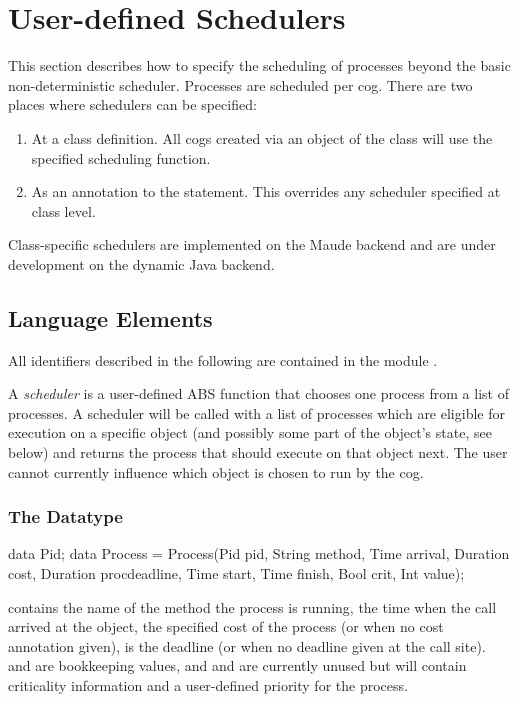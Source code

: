  \chapter{User-defined Schedulers}\label{ch:schedulers}
  This section describes how to specify the scheduling of processes
  beyond the basic non-deterministic scheduler.  Processes are scheduled
  per cog.  There are two places where schedulers can be specified:
\begin{enumerate}
\item At a class definition.  All cogs created via an object of the
  class will use the specified scheduling function.
\item As an annotation to the  statement.  This overrides
  any scheduler specified at class level.
\end{enumerate}
  Class-specific schedulers are implemented on the Maude backend and are
  under development on the dynamic Java backend.

\section{Language Elements}

  All identifiers described in the following are contained in the module
  .

  A \emph{scheduler} is a user-defined ABS function that chooses one process
  from a list of processes.  A scheduler will be called with a list of
  processes which are eligible for execution on a specific object (and
  possibly some part of the object's state, see below) and returns the
  process that should execute on that object next.  The user cannot
  currently influence which object is chosen to run by the cog.

\subsection{The  Datatype}

\begin{absexample} 
data Pid;
data Process = Process(Pid pid, String method, Time arrival,
    Duration cost, Duration procdeadline, Time start, Time finish, 
    Bool crit, Int value);
\end{absexample} 

    contains the name of the method the process is running,
    the time when the call arrived at the object,
    the specified cost of the process (or  when no cost
   annotation given),  is the deadline (or
    when no deadline given at the call site).
    and  are bookkeeping values, and 
   and  are currently unused but will contain criticality
   information and a user-defined priority for the process.

